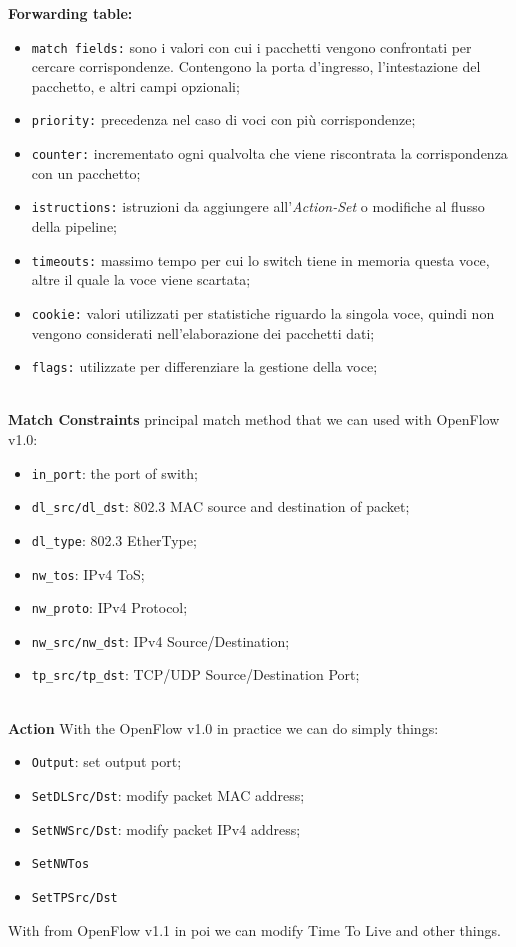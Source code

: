 \documentclass[conference,10pt]{IEEEtran}
\begin{document}
\textbf{Forwarding table:}
\begin{itemize}
 \item \texttt{match fields:} sono i valori con cui i pacchetti vengono confrontati per cercare corrispondenze. Contengono la porta d'ingresso, l'intestazione del pacchetto,
 e altri campi opzionali;
 \item \texttt{priority:} precedenza nel caso di voci con pi\`u corrispondenze;
 \item \texttt{counter:} incrementato ogni qualvolta che viene riscontrata la corrispondenza con un pacchetto;
 \item \texttt{istructions:} istruzioni da aggiungere all'\emph{Action-Set} o modifiche al flusso della pipeline;
 \item \texttt{timeouts:} massimo tempo per cui lo switch tiene in memoria questa voce, altre il quale la voce viene scartata;
 \item \texttt{cookie:} valori utilizzati per statistiche riguardo la singola voce, quindi non vengono considerati nell'elaborazione dei pacchetti dati;
 \item \texttt{flags:} utilizzate per differenziare la gestione della voce;
 \\
 \\
\end{itemize}

\textbf{Match Constraints}
principal match method that we can used with OpenFlow v1.0:
\begin{itemize}
 \item \texttt{in_port}: the port of swith;
 \item \texttt{dl_src/dl_dst}: 802.3 MAC source and destination of packet;
 \item \texttt{dl_type}: 802.3 EtherType;
 \item \texttt{nw_tos}: IPv4 ToS;
 \item \texttt{nw_proto}: IPv4 Protocol;
 \item \texttt{nw_src/nw_dst}: IPv4 Source/Destination;
 \item \texttt{tp_src/tp_dst}: TCP/UDP Source/Destination Port;
 \\
 \\
\end{itemize}

\textbf{Action}
With the OpenFlow v1.0 in practice we can do simply things:
\begin{itemize}
 \item \texttt{Output}: set output port;
 \item \texttt{SetDLSrc/Dst}: modify packet MAC address;
 \item \texttt{SetNWSrc/Dst}: modify packet IPv4 address;
 \item \texttt{SetNWTos}
 \item \texttt{SetTPSrc/Dst}
\end{itemize}
With from OpenFlow v1.1 in poi we can modify Time To Live and other things.
\end{document}
